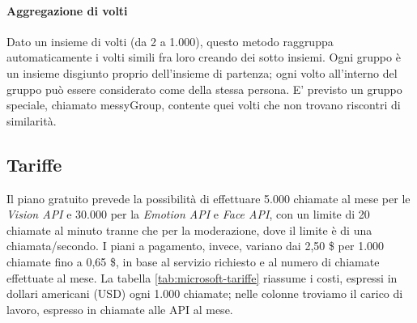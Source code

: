 \paragraph{Aggregazione di volti} Dato un insieme di volti (da 2 a 1.000), questo metodo raggruppa automaticamente i volti simili fra loro creando dei sotto insiemi.
Ogni gruppo è un insieme disgiunto proprio dell'insieme di partenza; ogni volto all'interno del gruppo può essere considerato come della stessa persona.
E' previsto un gruppo speciale, chiamato \textsf{messyGroup}, contente quei volti che non trovano riscontri di similarità.
%
%
\subsection{Tariffe}
Il piano gratuito prevede la possibilità di effettuare 5.000 chiamate al mese per le \textit{Vision API} e 30.000 per la \textit{Emotion API} e \textit{Face API}, con un limite di 20 chiamate al minuto tranne che per la moderazione, dove il limite è di una chiamata/secondo.
I piani a pagamento, invece, variano dai 2,50 \$ per 1.000 chiamate fino a 0,65 \$, in base al servizio richiesto e al numero di chiamate effettuate al mese.
La tabella \ref{tab:microsoft-tariffe} riassume i costi, espressi in dollari americani (USD) ogni 1.000 chiamate; nelle colonne troviamo il carico di lavoro, espresso in chiamate alle API al mese.


